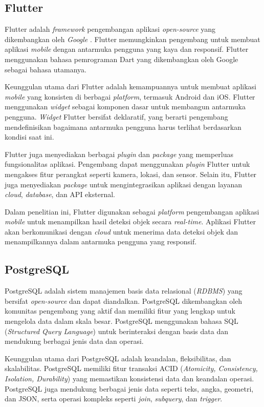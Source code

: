 \subsection{Flutter}

Flutter adalah \emph{framework} pengembangan aplikasi \emph{open-source} yang dikembangkan oleh \emph{Google} \parencite*{google2024}. Flutter memungkinkan pengembang untuk membuat aplikasi \emph{mobile} dengan antarmuka pengguna yang kaya dan responsif. Flutter menggunakan bahasa pemrograman Dart yang dikembangkan oleh Google sebagai bahasa utamanya.

Keunggulan utama dari Flutter adalah kemampuannya untuk membuat aplikasi \emph{mobile} yang konsisten di berbagai \emph{platform}, termasuk Android dan iOS. Flutter menggunakan \emph{widget} sebagai komponen dasar untuk membangun antarmuka pengguna. \emph{Widget} Flutter bersifat deklaratif, yang berarti pengembang mendefinisikan bagaimana antarmuka pengguna harus terlihat berdasarkan kondisi saat ini.

Flutter juga menyediakan berbagai \emph{plugin} dan \emph{package} yang memperluas fungsionalitas aplikasi. Pengembang dapat menggunakan \emph{plugin} Flutter untuk mengakses fitur perangkat seperti kamera, lokasi, dan sensor. Selain itu, Flutter juga menyediakan \emph{package} untuk mengintegrasikan aplikasi dengan layanan \emph{cloud}, \emph{database}, dan API eksternal.

Dalam penelitian ini, Flutter digunakan sebagai \emph{platform} pengembangan aplikasi \emph{mobile} untuk menampilkan hasil deteksi objek secara \emph{real-time}. Aplikasi Flutter akan berkomunikasi dengan \emph{cloud} untuk menerima data deteksi objek dan menampilkannya dalam antarmuka pengguna yang responsif.

\subsection{PostgreSQL}

PostgreSQL adalah sistem manajemen basis data relasional (\emph{RDBMS}) yang bersifat \emph{open-source} dan dapat diandalkan. PostgreSQL dikembangkan oleh komunitas pengembang yang aktif dan memiliki fitur yang lengkap untuk mengelola data dalam skala besar. PostgreSQL menggunakan bahasa SQL (\emph{Structured Query Language}) untuk berinteraksi dengan basis data dan mendukung berbagai jenis data dan operasi. \parencite*{postgresql2025}

Keunggulan utama dari PostgreSQL adalah keandalan, fleksibilitas, dan skalabilitas. PostgreSQL memiliki fitur transaksi ACID (\emph{Atomicity, Consistency, Isolation, Durability}) yang memastikan konsistensi data dan keandalan operasi. PostgreSQL juga mendukung berbagai jenis data seperti teks, angka, geometri, dan JSON, serta operasi kompleks seperti \emph{join}, \emph{subquery}, dan \emph{trigger}.

